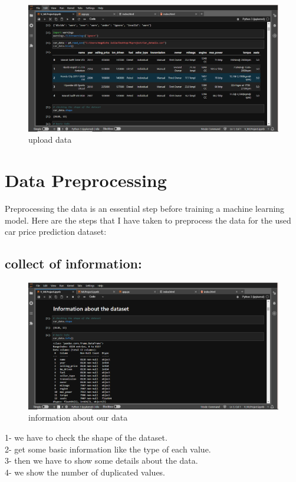 \documentclass{article}
\begin{document}
\begin{figure}[!h]
    \centering
    \includegraphics[width=1\textwidth]{data-f.png}
    \caption{upload data}
    \label{fig:my_label}
\end{figure}

\section{Data Preprocessing}
Preprocessing the data is an essential step before training a machine learning model. Here are the steps that I have taken to preprocess the data for the used car price prediction dataset:
\subsection{collect of information:}

\begin{figure}[!h]
    \centering
    \includegraphics[width=1\textwidth]{infoData.png}
    \caption{information about our data}
    \label{fig:my_label}
\end{figure}

\begin{flushleft}
1- we have to check the shape of the dataset.\\
2- get some basic information like the type of each value.\\
3- then we have to show some details about the data.\\
4- we show the number of duplicated values.
\end{flushleft}
\newpage
\end{document}
